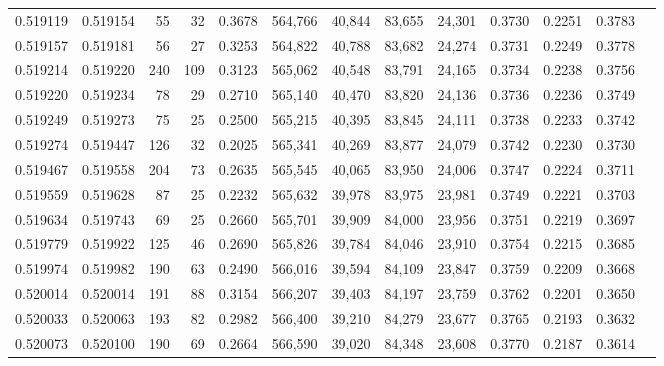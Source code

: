 \begin{tabular}{rrrrrrrrrrrrr}
0.519119 & 0.519154 &    55 &    32 &                                     0.3678 & 564,766 &  40,844 &  83,655 &  24,301 & 0.3730 & 0.2251 & 0.3783 \\
0.519157 & 0.519181 &    56 &    27 &                                     0.3253 & 564,822 &  40,788 &  83,682 &  24,274 & 0.3731 & 0.2249 & 0.3778 \\
0.519214 & 0.519220 &   240 &   109 &                                     0.3123 & 565,062 &  40,548 &  83,791 &  24,165 & 0.3734 & 0.2238 & 0.3756 \\
0.519220 & 0.519234 &    78 &    29 &                                     0.2710 & 565,140 &  40,470 &  83,820 &  24,136 & 0.3736 & 0.2236 & 0.3749 \\
0.519249 & 0.519273 &    75 &    25 &                                     0.2500 & 565,215 &  40,395 &  83,845 &  24,111 & 0.3738 & 0.2233 & 0.3742 \\
0.519274 & 0.519447 &   126 &    32 &                                     0.2025 & 565,341 &  40,269 &  83,877 &  24,079 & 0.3742 & 0.2230 & 0.3730 \\
0.519467 & 0.519558 &   204 &    73 &                                     0.2635 & 565,545 &  40,065 &  83,950 &  24,006 & 0.3747 & 0.2224 & 0.3711 \\
0.519559 & 0.519628 &    87 &    25 &                                     0.2232 & 565,632 &  39,978 &  83,975 &  23,981 & 0.3749 & 0.2221 & 0.3703 \\
0.519634 & 0.519743 &    69 &    25 &                                     0.2660 & 565,701 &  39,909 &  84,000 &  23,956 & 0.3751 & 0.2219 & 0.3697 \\
0.519779 & 0.519922 &   125 &    46 &                                     0.2690 & 565,826 &  39,784 &  84,046 &  23,910 & 0.3754 & 0.2215 & 0.3685 \\
0.519974 & 0.519982 &   190 &    63 &                                     0.2490 & 566,016 &  39,594 &  84,109 &  23,847 & 0.3759 & 0.2209 & 0.3668 \\
0.520014 & 0.520014 &   191 &    88 &                                     0.3154 & 566,207 &  39,403 &  84,197 &  23,759 & 0.3762 & 0.2201 & 0.3650 \\
0.520033 & 0.520063 &   193 &    82 &                                     0.2982 & 566,400 &  39,210 &  84,279 &  23,677 & 0.3765 & 0.2193 & 0.3632 \\
0.520073 & 0.520100 &   190 &    69 &                                     0.2664 & 566,590 &  39,020 &  84,348 &  23,608 & 0.3770 & 0.2187 & 0.3614 \\

\end{tabular}
